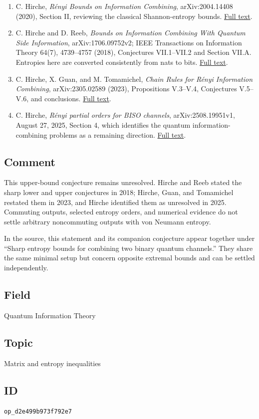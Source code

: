 \begin{enumerate}[label={},leftmargin=4.8em,labelsep=0.5em]
  \footnotesize
  \item[\textup{[Hirche20]}]\label{ref:d2e4-hirche20}
  C. Hirche, \emph{Rényi Bounds on Information Combining}, arXiv:2004.14408 (2020), Section II, reviewing the classical Shannon-entropy bounds. \href{https://arxiv.org/html/2004.14408v1}{Full text}.

  \item[\textup{[Hirche18]}]\label{ref:d2e4-hirche18}
  C. Hirche and D. Reeb, \emph{Bounds on Information Combining With Quantum Side Information}, arXiv:1706.09752v2; IEEE Transactions on Information Theory 64(7), 4739–4757 (2018), Conjectures VII.1–VII.2 and Section VII.A. Entropies here are converted consistently from nats to bits. \href{https://arxiv.org/html/1706.09752v2}{Full text}.

  \item[\textup{[Hirche23]}]\label{ref:d2e4-hirche23}
  C. Hirche, X. Guan, and M. Tomamichel, \emph{Chain Rules for Rényi Information Combining}, arXiv:2305.02589 (2023), Propositions V.3–V.4, Conjectures V.5–V.6, and conclusions. \href{https://arxiv.org/html/2305.02589}{Full text}.

  \item[\textup{[Hirche25]}]\label{ref:d2e4-hirche25}
  C. Hirche, \emph{Rényi partial orders for BISO channels}, arXiv:2508.19951v1, August 27, 2025, Section 4, which identifies the quantum information-combining problems as a remaining direction. \href{https://arxiv.org/html/2508.19951}{Full text}.
\end{enumerate}

\subsection*{Comment}

This upper-bound conjecture remains unresolved. Hirche and Reeb stated the sharp lower and upper conjectures in 2018; Hirche, Guan, and Tomamichel restated them in 2023, and Hirche identified them as unresolved in 2025. Commuting outputs, selected entropy orders, and numerical evidence do not settle arbitrary noncommuting outputs with von Neumann entropy.

In the source, this statement and its companion conjecture appear together under “Sharp entropy bounds for combining two binary quantum channels.” They share the same minimal setup but concern opposite extremal bounds and can be settled independently.

\subsection*{Field}

Quantum Information Theory

\subsection*{Topic}

Matrix and entropy inequalities

\subsection*{ID}

\texttt{op\_d2e499b973f792e7}
